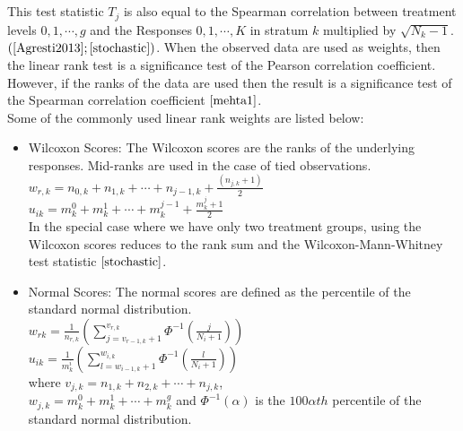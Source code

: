 \documentclass[12pt,oneside]{report}
\theoremstyle{definition}
\theoremstyle{mystyle}
\begin{document}
This test statistic $T_{j}^{}$ is also equal to  the Spearman correlation between treatment levels $0,1,\cdots,g$ and the Responses $0,1,\cdots,K$ in stratum $k$ multiplied by $\sqrt{N_{k}-1}$. $(\cite{Agresti2013};\cite{stochastic})$. When the observed data are used as weights, then the linear rank test is a significance test of the Pearson correlation coefficient. However, if the ranks of the data are used then the result is a  significance test of the Spearman correlation coefficient $\cite{mehta1}$.\\
Some of the commonly used linear rank weights are listed below:
\begin{itemize}
	\item Wilcoxon Scores: The Wilcoxon scores are the ranks of the underlying responses. Mid-ranks are used in the  case of tied observations.\\
	$w_{r,k}=n_{0,k}+n_{1,k}+\cdots+n_{j-1,k}+\frac{(n_{j,k}+1)}{2}  $\\
	
	$u_{ik}=m^{0}_{k}+m^{1}_{k}+\cdots+ m^{j-1}_{k}+\frac{m^{j}_{k}+1}{2}  $\\
	
	
	In the  special  case where we have only two  treatment groups, using the Wilcoxon scores reduces  to the rank sum and  the Wilcoxon-Mann-Whitney test statistic $\cite{stochastic}$.
	\item Normal Scores: The normal scores are  defined as the percentile of the standard normal distribution.\\
	$w_{rk}=\frac{1}{n_{r,k}}\left(\sum\limits_{j=v_{r-1,k}+1}^{v_{r,k}} \Phi^{-1}\left(\frac{j}{N_{i}+1}  \right)  \right)$\\
	
	$u_{ik}=\frac{1}{m_{k}^{i}}\left(\sum\limits_{l=w_{i-1,k}+1}^{w_{i,k}} \Phi^{-1}\left(\frac{l}{N_{i}+1}  \right)  \right)$\\
	
	
	where $v_{j,k}=n_{1,k}+n_{2,k}+\cdots + n_{j,k} $,\\
	$w_{j,k}=m_{k}^{0}+m_{k}^{1}+\cdots + m_{k}^{g} $ and $\Phi^{-1}(\alpha)$  is the $100 \alpha th$ percentile of the standard normal distribution.\\
	

\end{itemize}
\end{document}
